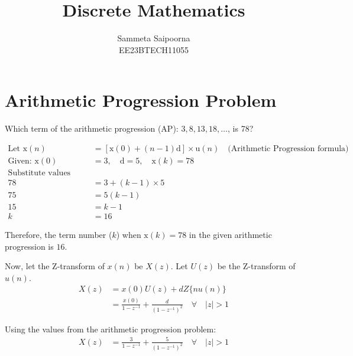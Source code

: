 \documentclass[12pt]{article}
\title{Discrete Mathematics}
\author{Sammeta Saipoorna\\ EE23BTECH11055}
\date{}
\begin{document}
\maketitle

\section{Arithmetic Progression Problem}
Which term of the arithmetic progression (AP): $3, 8, 13, 18, \ldots$, is 78?

\begin{align*}
\text{Let } \mathrm{x}(n) &= [\mathrm{x}(0) + (n-1)\mathrm{d}] \times \mathrm{u}(n) \quad \text{(Arithmetic Progression formula)} \\
\text{Given: } \mathrm{x}(0) &= 3, \quad \mathrm{d} = 5, \quad \mathrm{x}(k) = 78 \\
\text{Substitute values into the formula:} \\
78 &= 3 + (k-1) \times 5 \\
75 &= 5(k-1) \\
15 &= k-1 \\
k &= 16
\end{align*}

Therefore, the term number ($k$) when $\mathrm{x}(k) = 78$ in the given arithmetic progression is $16$.

Now, let the Z-transform of $x(n)$ be $X(z)$. Let $U(z)$ be the Z-transform of $u(n)$.
\begin{align*}
X(z) &= x(0)U(z) + dZ\{nu(n)\} \\
&= \frac{x(0)}{1 - z^{-1}} + \frac{d}{(1 - z^{-1})^2} \quad \forall \quad |z| > 1
\end{align*}

Using the values from the arithmetic progression problem:
\begin{align*}
X(z) &= \frac{3}{1 - z^{-1}} + \frac{5}{(1 - z^{-1})^2} \quad \forall \quad |z| > 1
\end{align*}
\end{document}
